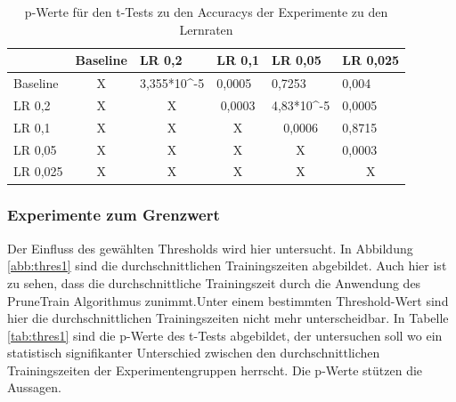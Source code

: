 \begin{table}[]
\caption{p-Werte für den t-Tests zu den Accuracys der Experimente zu den Lernraten}
\begin{tabular}{l|c|c|c|c|l|}
\cline{2-6}
                               & \multicolumn{1}{l|}{Baseline} & \multicolumn{1}{l|}{LR 0,2}  & \multicolumn{1}{l|}{LR 0,1} & \multicolumn{1}{l|}{LR 0,05}                        & LR 0,025                       \\ \hline
\multicolumn{1}{|l|}{Baseline} & X                             & 3,355*10\textasciicircum{}-5 & \multicolumn{1}{l|}{0,0005} & \multicolumn{1}{l|}{\cellcolor[HTML]{FE0000}0,7253} & 0,004                          \\ \hline
\multicolumn{1}{|l|}{LR 0,2}   & X                             & X                            & 0,0003                      & 4,83*10\textasciicircum{}-5                         & 0,0005                         \\ \hline
\multicolumn{1}{|l|}{LR 0,1}   & X                             & X                            & X                           & 0,0006                                              & \cellcolor[HTML]{FE0000}0,8715 \\ \hline
\multicolumn{1}{|l|}{LR 0,05}  & X                             & X                            & X                           & X                                                   & 0,0003                         \\ \hline
\multicolumn{1}{|l|}{LR 0,025} & X                             & X                            & X                           & X                                                   & \multicolumn{1}{c|}{X}         \\ \hline
\end{tabular}
\label{tab:lr2}
\end{table}
 
\subsubsection{Experimente zum Grenzwert}

Der Einfluss des gewählten Thresholds wird hier untersucht. In Abbildung \ref{abb:thres1} sind die durchschnittlichen Trainingszeiten abgebildet. Auch hier ist zu sehen, dass die durchschnittliche Trainingszeit durch die Anwendung des PruneTrain Algorithmus zunimmt.Unter einem bestimmten Threshold-Wert sind hier die durchschnittlichen Trainingszeiten nicht mehr unterscheidbar. In Tabelle \ref{tab:thres1} sind die p-Werte des t-Tests abgebildet, der untersuchen soll wo ein statistisch signifikanter Unterschied zwischen den durchschnittlichen Trainingszeiten der Experimentengruppen herrscht. Die p-Werte stützen die Aussagen.

